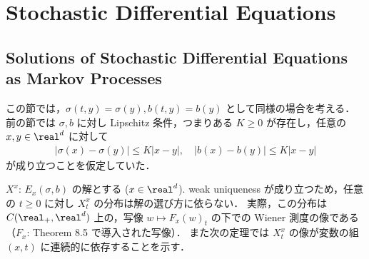 \documentclass{jsarticle}
\title{}
\author{}
\date{
}
\begin{document}
\setcounter{section}{7}
\section{Stochastic Differential Equations}
\setcounter{subsection}{2}
\subsection{Solutions of Stochastic Differential Equations as Markov Processes}

この節では，$\sigma(t, y)=\sigma(y), b(t, y)=b(y)$ として同様の場合を考える．
前の節では $\sigma, b$ に対し Lipschitz 条件，つまりある $K\ge0$ が存在し，任意の $x, y\in\real^d$ に対して
\begin{align}
    \lvert \sigma(x)-\sigma(y)\rvert \le K\lvert x-y\rvert,\quad
    \lvert b(x)-b(y)\rvert \le K\lvert x-y\rvert
\end{align}
が成り立つことを仮定していた．

$X^x$: $E_x(\sigma, b)$ の解とする ($x\in\real^d$).
weak uniqueness が成り立つため，任意の $t\ge0$ に対し $X_t^x$ の分布は解の選び方に依らない\nazo．
実際，この分布は $C(\real_+, \real^d)$ 上の，写像 $w\mapsto F_x(w)_t$ の下での Wiener 測度の像である（$F_x$: Theorem 8.5 で導入された写像）．
また次の定理では $X_t^x$ の像が変数の組 $(x, t)$ に連続的に依存することを示す．
\end{document}
